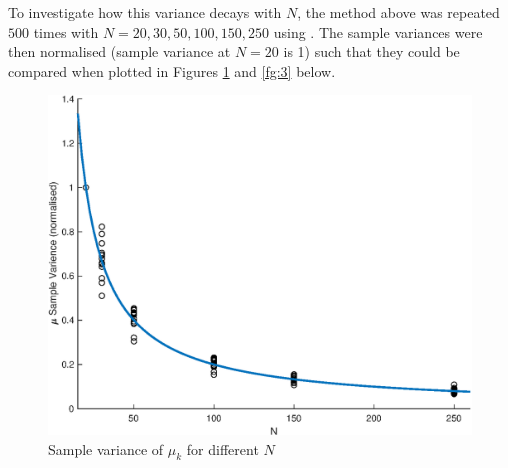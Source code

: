 \documentclass[10pt,a4paper,notitlepage]{article}
\begin{document}
To investigate how this variance decays with $N$, the method above was repeated $500$ times with $N=20,30,50,100,150,250$ using . The sample variances were then normalised (sample variance at $N=20$ is 1) such that they could be compared when plotted in Figures \ref{fg:2} and \ref{fg:3} below.
\begin{figure}[H]
\centering
\includegraphics[width=12cm]{Image_2}
\caption{Sample variance of $\mu_{k}$ for different $N$}\label{fg:2}
\end{figure}
\end{document}
